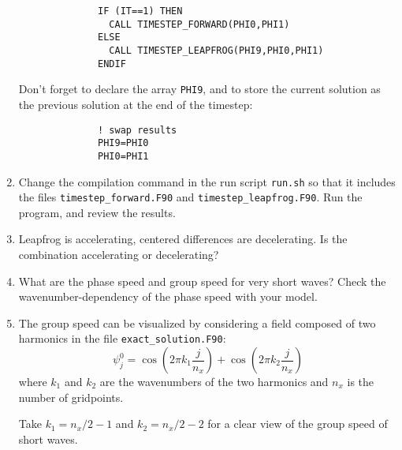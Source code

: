 \documentclass[a4paper]{article}
\begin{document}
\begin{enumerate}
		\begin{verbatim}
			  IF (IT==1) THEN
			    CALL TIMESTEP_FORWARD(PHI0,PHI1)
			  ELSE
			    CALL TIMESTEP_LEAPFROG(PHI9,PHI0,PHI1)
			  ENDIF
		\end{verbatim}
		\par
		Don't forget to declare the array \verb+PHI9+, and to store the current solution as the previous solution at the end of the timestep:
		\begin{verbatim}
			  ! swap results
			  PHI9=PHI0
			  PHI0=PHI1
		\end{verbatim}
	\item Change the compilation command in the run script \verb+run.sh+ so that it includes the files \verb+timestep_forward.F90+ and \verb+timestep_leapfrog.F90+. Run the program, and review the results.
	\item Leapfrog is accelerating, centered differences are decelerating. Is the combination accelerating or decelerating?
	\item What are the phase speed and group speed for very short waves? Check the wavenumber-dependency of the phase speed with your model.
	\item The group speed can be visualized by considering a field composed of two harmonics in the file \verb+exact_solution.F90+:
		\begin{equation*}
			\psi^0_j=\cos\left(2\pi k_1 \frac{j}{n_x} \right)+\cos\left(2\pi k_2 \frac{j}{n_x} \right)
		\end{equation*}
		where $k_1$ and $k_2$ are the wavenumbers of the two harmonics and $n_x$ is the number of gridpoints.
		\par
		Take $k_1=n_x/2-1$ and $k_2=n_x/2-2$ for a clear view of the group speed of short waves.
\end{enumerate}
%
\end{document}
